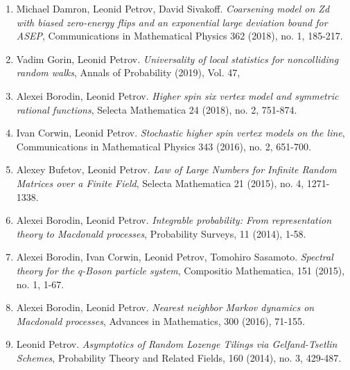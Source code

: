 \documentclass{amsart}
\begin{document}
\begin{enumerate}
\item Michael Damron, Leonid Petrov, David Sivakoff. \emph{Coarsening model on Zd with biased zero-energy flips and an exponential large deviation bound for ASEP}, Communications in Mathematical Physics 362 (2018), no. 1, 185-217.
\item Vadim Gorin, Leonid Petrov. \emph{Universality of local statistics for noncolliding random walks}, Annals of Probability (2019), Vol. 47, 
\item Alexei Borodin, Leonid Petrov. \emph{Higher spin six vertex model and symmetric rational functions}, Selecta Mathematica 24 (2018), no. 2, 751-874.
\item Ivan Corwin, Leonid Petrov. \emph{Stochastic higher spin vertex models on the line}, Communications in Mathematical Physics 343 (2016), no. 2, 651-700.
\item Alexey Bufetov, Leonid Petrov. \emph{Law of Large Numbers for Infinite Random Matrices over a Finite Field}, Selecta Mathematica 21 (2015), no. 4, 1271-1338.
\item Alexei Borodin, Leonid Petrov. \emph{Integrable probability: From representation theory to Macdonald processes}, Probability Surveys, 11 (2014), 1-58.
\item Alexei Borodin, Ivan Corwin, Leonid Petrov, Tomohiro Sasamoto. \emph{Spectral theory for the q-Boson particle system}, Compositio Mathematica, 151 (2015), no. 1, 1-67.
\item Alexei Borodin, Leonid Petrov. \emph{Nearest neighbor Markov dynamics on Macdonald processes}, Advances in Mathematics, 300 (2016), 71-155.
\item Leonid Petrov. \emph{Asymptotics of Random Lozenge Tilings via Gelfand-Tsetlin Schemes}, Probability Theory and Related Fields, 160 (2014), no. 3, 429-487.

\end{enumerate}






	
\end{document}
